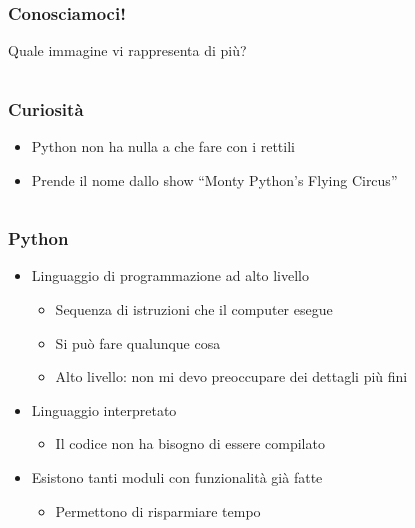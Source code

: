 \begin{contentframe}
    \frametitle{Conosciamoci!}
    
    Quale immagine vi rappresenta di più?

    \bigskip
    \begin{columns}
        \centering
        
        \centering
        
        \centering
    \end{columns}
\end{contentframe}


\begin{exampleframe}
    \frametitle{Curiosità}

    \begin{itemize}
        \item Python non ha nulla a che fare con i rettili
        \item Prende il nome dallo show ``Monty Python's Flying Circus''
    \end{itemize}

    \bigskip
    \begin{columns}
        \centering
        
        \centering
    \end{columns}
\end{exampleframe}

\begin{contentframe}
    \frametitle{Python}

    \begin{itemize}
        \item Linguaggio di programmazione ad alto livello
        \begin{itemize}
            \item Sequenza di istruzioni che il computer esegue
            \item Si può fare qualunque cosa
            \item Alto livello: non mi devo preoccupare dei dettagli più fini
        \end{itemize}
        
        \bigskip
        \item Linguaggio interpretato
        \begin{itemize}
            \item Il codice non ha bisogno di essere compilato
        \end{itemize}

        \bigskip
        \item Esistono tanti moduli con funzionalità già fatte
        \begin{itemize}
            \item Permettono di risparmiare tempo
        \end{itemize}
    \end{itemize}
\end{contentframe}

